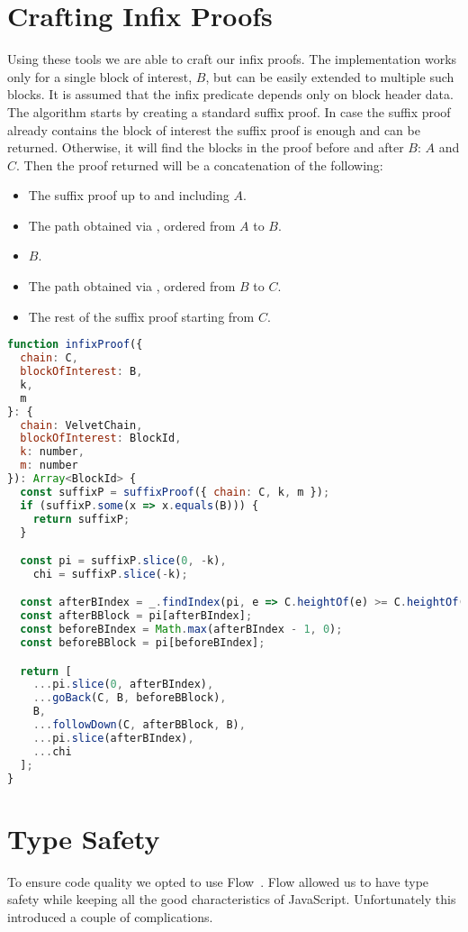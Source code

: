 \section{Crafting Infix Proofs}
Using these tools we are able to craft our infix proofs. The implementation works only for a single block of interest, $B$, but can be easily extended to multiple such blocks. It is assumed that the infix predicate depends only on block header data. The algorithm starts by creating a standard suffix proof. In case the suffix proof already contains the block of interest the suffix proof is enough and can be returned. Otherwise, it will find the blocks in the proof before and after $B$: $A$ and $C$. Then the proof returned will be a concatenation of the following:

\begin{itemize}
  \item The suffix proof up to and including $A$.
  \item The path obtained via , ordered from $A$ to $B$.
  \item $B$.
  \item The path obtained via , ordered from $B$ to $C$.
  \item The rest of the suffix proof starting from $C$.
\end{itemize}

\begin{lstlisting}[language=Javascript]
function infixProof({
  chain: C,
  blockOfInterest: B,
  k,
  m
}: {
  chain: VelvetChain,
  blockOfInterest: BlockId,
  k: number,
  m: number
}): Array<BlockId> {
  const suffixP = suffixProof({ chain: C, k, m });
  if (suffixP.some(x => x.equals(B))) {
    return suffixP;
  }

  const pi = suffixP.slice(0, -k),
    chi = suffixP.slice(-k);

  const afterBIndex = _.findIndex(pi, e => C.heightOf(e) >= C.heightOf(B));
  const afterBBlock = pi[afterBIndex];
  const beforeBIndex = Math.max(afterBIndex - 1, 0);
  const beforeBBlock = pi[beforeBIndex];

  return [
    ...pi.slice(0, afterBIndex),
    ...goBack(C, B, beforeBBlock),
    B,
    ...followDown(C, afterBBlock, B),
    ...pi.slice(afterBIndex),
    ...chi
  ];
}
\end{lstlisting}

\section{Type Safety}
To ensure code quality we opted to use Flow~\cite{flow}. Flow allowed us to have type safety while keeping all the good characteristics of JavaScript. Unfortunately this introduced a couple of complications.

